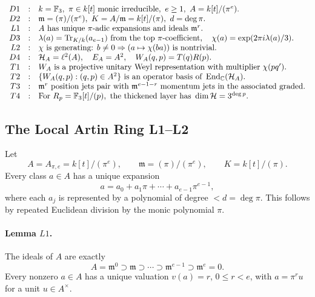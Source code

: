 \[
\begin{array}{rcl}
D1&:&k=\mathbb F_3,\ \pi\in k[t]\text{ monic irreducible},\
      e\ge1,\ A=k[t]/(\pi^e).\\
D2&:&\mathfrak m=(\pi)/(\pi^e),\ K=A/\mathfrak m=k[t]/(\pi),\
      d=\deg\pi.\\
L1&:&A\text{ has unique }\pi\text{-adic expansions and ideals }
      \mathfrak m^r.\\
D3&:&\lambda(a)=\operatorname{Tr}_{K/k}(a_{e-1})\text{ from the top }\pi\text{-coefficient},
      \quad \chi(a)=\exp(2\pi i\lambda(a)/3).\\
L2&:&\chi\text{ is generating: }b\ne0\Rightarrow
      (a\mapsto\chi(ba))\text{ is nontrivial}.\\
D4&:&\mathcal H_A=\ell^2(A),\quad E_A=A^2,\quad
      W_A(q,p)=T(q)R(p).\\
T1&:&W_A\text{ is a projective unitary Weyl representation with multiplier }
      \chi(pq').\\
T2&:&\{W_A(q,p):(q,p)\in A^2\}\text{ is an operator basis of }
      \operatorname{End}_\mathbb C(\mathcal H_A).\\
T3&:&\mathfrak m^r\text{ position jets pair with }
      \mathfrak m^{e-1-r}\text{ momentum jets in the associated graded}.\\
T4&:&\text{For }R_p=\mathbb F_3[t]/(p),\text{ the thickened layer has }
      \dim\mathcal H=3^{\deg p}.
\end{array}
\]

\subsection{The Local Artin Ring L1--L2}

Let
\[
  A=A_{\pi,e}=k[t]/(\pi^e),\qquad
  \mathfrak m=(\pi)/(\pi^e),\qquad K=k[t]/(\pi).
\]
Every class \(a\in A\) has a unique expansion
\[
  a=a_0+a_1\pi+\cdots+a_{e-1}\pi^{e-1},
\]
where each \(a_j\) is represented by a polynomial of degree \(<d=\deg\pi\).
This follows by repeated Euclidean division by the monic polynomial \(\pi\).

\paragraph{Lemma \(L1\).}
The ideals of \(A\) are exactly
\[
  A=\mathfrak m^0\supset\mathfrak m\supset\cdots
  \supset\mathfrak m^{e-1}\supset\mathfrak m^e=0.
\]
Every nonzero \(a\in A\) has a unique valuation \(v(a)=r\), \(0\le r<e\),
with \(a=\pi^r u\) for a unit \(u\in A^\times\).

